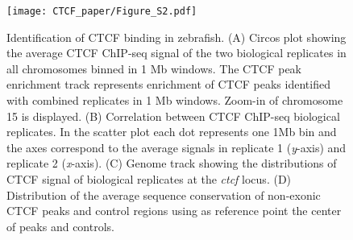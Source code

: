 		\newpage

		\begin{figure}[h!]
			\centering
			\texttt{[image: CTCF\_paper/Figure\_S2.pdf]}
  			\caption[six]{Identification of CTCF binding in zebrafish.
(A) Circos plot showing the average CTCF ChIP-seq signal of the two biological replicates in all chromosomes binned in 1 Mb windows. The CTCF peak enrichment track represents enrichment of CTCF peaks identified with combined replicates in 1 Mb windows. Zoom-in of chromosome 15 is displayed.
(B) Correlation between CTCF ChIP-seq biological replicates. In the scatter plot each dot represents one 1Mb bin and the axes correspond to the average signals in replicate 1 (\textit{y}-axis) and replicate 2 (\textit{x}-axis).
(C) Genome track showing the distributions of CTCF signal of biological replicates at the \textit{ctcf} locus.
(D) Distribution of the average sequence conservation of non-exonic CTCF peaks and control regions using as reference point the center of peaks and controls.}
			\label{six}
		\end{figure}

		\newpage

